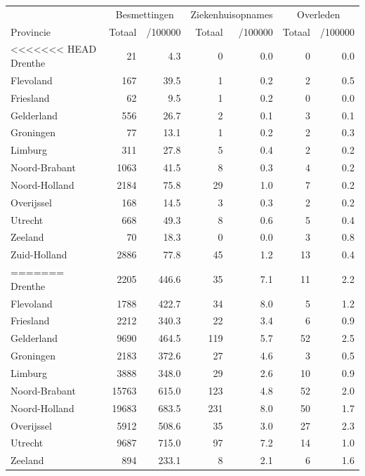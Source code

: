 \documentclass[
  english,
  man,floatsintext]{apa6}
\begin{document}
\begin{table}[H]
\centering
\begin{threeparttable}
\begin{tabular}{lrrrrrr}
\toprule
\multicolumn{1}{c}{ } & \multicolumn{2}{c}{Besmettingen} & \multicolumn{2}{c}{Ziekenhuisopnames} & \multicolumn{2}{c}{Overleden} \\
\cmidrule(l{3pt}r{3pt}){2-3} \cmidrule(l{3pt}r{3pt}){4-5} \cmidrule(l{3pt}r{3pt}){6-7}
Provincie & Totaal & /100000 & Totaal & /100000 & Totaal & /100000\\
\midrule
<<<<<<< HEAD
Drenthe & 21 & 4.3 & 0 & 0.0 & 0 & 0.0\\
Flevoland & 167 & 39.5 & 1 & 0.2 & 2 & 0.5\\
Friesland & 62 & 9.5 & 1 & 0.2 & 0 & 0.0\\
Gelderland & 556 & 26.7 & 2 & 0.1 & 3 & 0.1\\
Groningen & 77 & 13.1 & 1 & 0.2 & 2 & 0.3\\
Limburg & 311 & 27.8 & 5 & 0.4 & 2 & 0.2\\
Noord-Brabant & 1063 & 41.5 & 8 & 0.3 & 4 & 0.2\\
Noord-Holland & 2184 & 75.8 & 29 & 1.0 & 7 & 0.2\\
Overijssel & 168 & 14.5 & 3 & 0.3 & 2 & 0.2\\
Utrecht & 668 & 49.3 & 8 & 0.6 & 5 & 0.4\\
Zeeland & 70 & 18.3 & 0 & 0.0 & 3 & 0.8\\
Zuid-Holland & 2886 & 77.8 & 45 & 1.2 & 13 & 0.4\\
=======
Drenthe & 2205 & 446.6 & 35 & 7.1 & 11 & 2.2\\
Flevoland & 1788 & 422.7 & 34 & 8.0 & 5 & 1.2\\
Friesland & 2212 & 340.3 & 22 & 3.4 & 6 & 0.9\\
Gelderland & 9690 & 464.5 & 119 & 5.7 & 52 & 2.5\\
Groningen & 2183 & 372.6 & 27 & 4.6 & 3 & 0.5\\
Limburg & 3888 & 348.0 & 29 & 2.6 & 10 & 0.9\\
Noord-Brabant & 15763 & 615.0 & 123 & 4.8 & 52 & 2.0\\
Noord-Holland & 19683 & 683.5 & 231 & 8.0 & 50 & 1.7\\
Overijssel & 5912 & 508.6 & 35 & 3.0 & 27 & 2.3\\
Utrecht & 9687 & 715.0 & 97 & 7.2 & 14 & 1.0\\
Zeeland & 894 & 233.1 & 8 & 2.1 & 6 & 1.6\\

\end{tabular}
\end{threeparttable}
\end{table}
\end{document}
